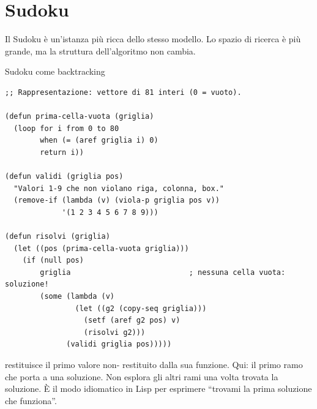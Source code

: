 \section{Sudoku}

Il Sudoku è un'istanza più ricca dello stesso modello.
Lo spazio di ricerca è più grande, ma la struttura
dell'algoritmo non cambia.

\begin{concetto}{Sudoku come backtracking}

\boxsep
{}
\end{concetto}

\begin{esempio}
\begin{lstlisting}
;; Rappresentazione: vettore di 81 interi (0 = vuoto).

(defun prima-cella-vuota (griglia)
  (loop for i from 0 to 80
        when (= (aref griglia i) 0)
        return i))

(defun validi (griglia pos)
  "Valori 1-9 che non violano riga, colonna, box."
  (remove-if (lambda (v) (viola-p griglia pos v))
             '(1 2 3 4 5 6 7 8 9)))

(defun risolvi (griglia)
  (let ((pos (prima-cella-vuota griglia)))
    (if (null pos)
        griglia                           ; nessuna cella vuota: soluzione!
        (some (lambda (v)
                (let ((g2 (copy-seq griglia)))
                  (setf (aref g2 pos) v)
                  (risolvi g2)))
              (validi griglia pos)))))
\end{lstlisting}
\end{esempio}

\begin{intuizione}
 restituisce il primo valore non- restituito
dalla sua funzione. Qui: il primo ramo che porta a una soluzione.
Non esplora gli altri rami una volta trovata la soluzione.
È il modo idiomatico in Lisp per esprimere ``trovami la prima
soluzione che funziona''.
\end{intuizione}

